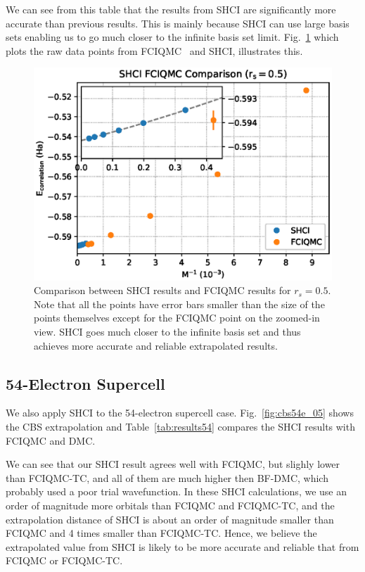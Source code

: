 We can see from this table that the results from SHCI are significantly more accurate than previous results.
This is mainly because SHCI can use large basis sets enabling us to go much closer to the infinite basis set limit.
Fig.~\ref{fig:comparison} which plots the raw data points from FCIQMC~\cite{shepherd2012full} and SHCI, illustrates this.
\begin{figure}
  \begin{center}
  \includegraphics[width=\linewidth]{figs/compare.eps}
  \end{center}
  \vspace{-0.2cm}
  \caption{Comparison between SHCI results and FCIQMC results for $r_s=0.5$.
  Note that all the points have error bars smaller than the size of the points themselves except for the FCIQMC point on the zoomed-in view.
  SHCI goes much closer to the infinite basis set and thus achieves more accurate and reliable extrapolated results.
  }
  \label{fig:comparison}
\end{figure}

\subsection{54-Electron Supercell}
We also apply SHCI to the 54-electron supercell case.
Fig.~\ref{fig:cbs54e_05} shows the CBS extrapolation and Table~\ref{tab:results54} compares the SHCI results with FCIQMC and DMC.

We can see that our SHCI result agrees well with FCIQMC, but slighly lower than FCIQMC-TC, and all of them are much higher then BF-DMC, which probably used a poor trial wavefunction.
In these SHCI calculations, we use an order of magnitude more orbitals than FCIQMC and FCIQMC-TC, and the extrapolation distance of SHCI is about an order of magnitude smaller than FCIQMC and 4 times smaller than FCIQMC-TC.
Hence, we believe the extrapolated value from SHCI is likely to be more accurate and reliable that from FCIQMC or FCIQMC-TC.

